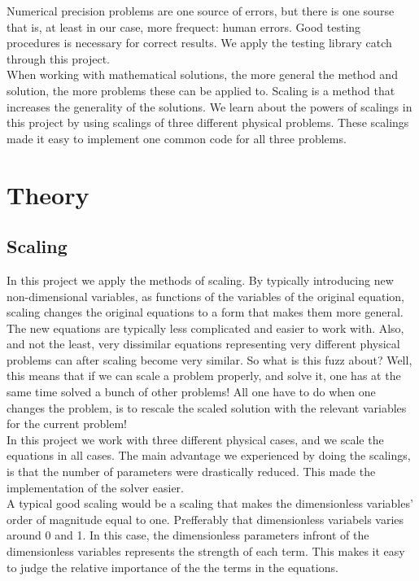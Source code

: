 \documentclass{article}
\begin{document}
Numerical precision problems are one source of errors, but there is one sourse that is, at least in our case, more frequect: human errors. Good testing procedures is necessary for correct results. We apply the testing library catch through this project.\\

When working with mathematical solutions, the more general the method and solution, the more problems these can be applied to. Scaling is a method that increases the generality of the solutions. We learn about the powers of scalings in this project by using scalings of three different physical problems. These scalings made it easy to implement one common code for all three problems.

\section{Theory}

\subsection{Scaling}
In this project we apply the methods of scaling. By typically introducing new non-dimensional variables, as functions of the variables of the original equation, scaling changes the original equations to a form that makes them more general. The new equations are typically less complicated and easier to work with. Also, and not the least, very dissimilar equations representing very different physical problems can after scaling become very similar. So what is this fuzz about? Well, this means that if we can scale a problem properly, and solve it, one has at the same time solved a bunch of other problems! All one have to do when one changes the problem, is to rescale the scaled solution with the relevant variables for the current problem!\\

In this project we work with three different physical cases, and we scale the equations in all cases. The main advantage we experienced by doing the scalings, is that the number of parameters were drastically reduced. This made the implementation of the solver easier. \\

A typical good scaling would be a scaling that makes the dimensionless variables' order of magnitude equal to one. Prefferably that dimensionless variabels varies around 0 and 1. In this case, the dimensionless parameters infront of the dimensionless variables represents the strength of each term. This makes it easy to judge the relative importance of the the terms in the equations. 
\end{document}
